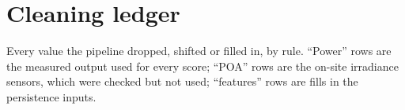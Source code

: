 \documentclass[11pt]{article}
\begin{document}



\appendix
\section{Cleaning ledger}\label{app:ledger}

Every value the pipeline dropped, shifted or filled in, by rule. ``Power'' rows are the measured output used for every score; ``POA'' rows are the on-site irradiance sensors, which were checked but not used; ``features'' rows are fills in the persistence inputs.

\begin{center}
\scriptsize

\end{center}
\end{document}
